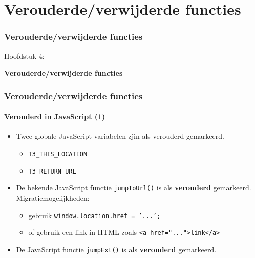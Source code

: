 %

\section{Verouderde/verwijderde functies}
\begin{frame}[fragile]
	\frametitle{Verouderde/verwijderde functies}

	\begin{center}\huge{Hoofdstuk 4:}\end{center}
	\begin{center}\huge{\color{typo3darkgrey}\textbf{Verouderde/verwijderde functies}}\end{center}

\end{frame}


\begin{frame}[fragile]
	\frametitle{Verouderde/verwijderde functies}
	\framesubtitle{Verouderd in JavaScript (1)}

	\begin{itemize}
		\item Twee globale JavaScript-variabelen zjin als verouderd gemarkeerd.

			\begin{itemize}
				\item \texttt{T3\_THIS\_LOCATION}
				\item \texttt{T3\_RETURN\_URL}
			\end{itemize}

		\item De bekende JavaScript functie \texttt{jumpToUrl()} is als \textbf{verouderd} gemarkeerd.
			Migratiemogelijkheden:

			\begin{itemize}
				\item gebruik \texttt{window.location.href = '...';}
				\item of gebruik een link in HTML zoals \texttt{<a href="...">link</a>}
			\end{itemize}

		\item De JavaScript functie \texttt{jumpExt()} is als \textbf{verouderd} gemarkeerd.

	\end{itemize}

\end{frame}


